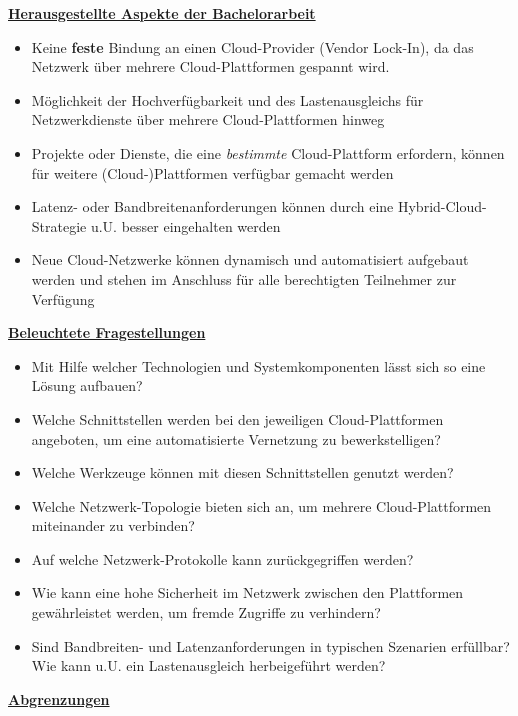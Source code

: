 \textbf{\underline{Herausgestellte Aspekte der Bachelorarbeit}}
\begin{itemize}
    \item Keine \textbf{feste} Bindung an einen Cloud-Provider (\glqq Vendor Lock-In\grqq{}), da das Netzwerk über mehrere Cloud-Plattformen gespannt wird.
    \item Möglichkeit der Hochverfügbarkeit und des Lastenausgleichs für Netzwerkdienste über mehrere Cloud-Plattformen hinweg
    \item Projekte oder Dienste, die eine \textit{bestimmte} Cloud-Plattform erfordern, können für weitere (Cloud-)Plattformen verfügbar gemacht werden
    \item Latenz- oder Bandbreitenanforderungen können durch eine Hybrid-Cloud-Strategie u.U. besser eingehalten werden
    \item Neue Cloud-Netzwerke können dynamisch und automatisiert aufgebaut werden und stehen im Anschluss für alle berechtigten Teilnehmer zur Verfügung
\end{itemize}

\textbf{\underline{Beleuchtete Fragestellungen}}
\begin{itemize}
    \item Mit Hilfe welcher Technologien und Systemkomponenten lässt sich so eine Lösung aufbauen?
    \item Welche Schnittstellen werden bei den jeweiligen Cloud-Plattformen angeboten, um eine automatisierte Vernetzung zu bewerkstelligen?
    \item Welche Werkzeuge können mit diesen Schnittstellen genutzt werden?
    \item Welche Netzwerk-Topologie bieten sich an, um mehrere Cloud-Plattformen miteinander zu verbinden?
    \item Auf welche Netzwerk-Protokolle kann zurückgegriffen werden?
    \item Wie kann eine hohe Sicherheit im Netzwerk zwischen den Plattformen gewährleistet werden, um fremde Zugriffe zu verhindern?
    \item Sind Bandbreiten- und Latenzanforderungen in typischen Szenarien erfüllbar? Wie kann u.U. ein Lastenausgleich herbeigeführt werden?
\end{itemize}

\textbf{\underline{Abgrenzungen}}\label{abgrenzung}

